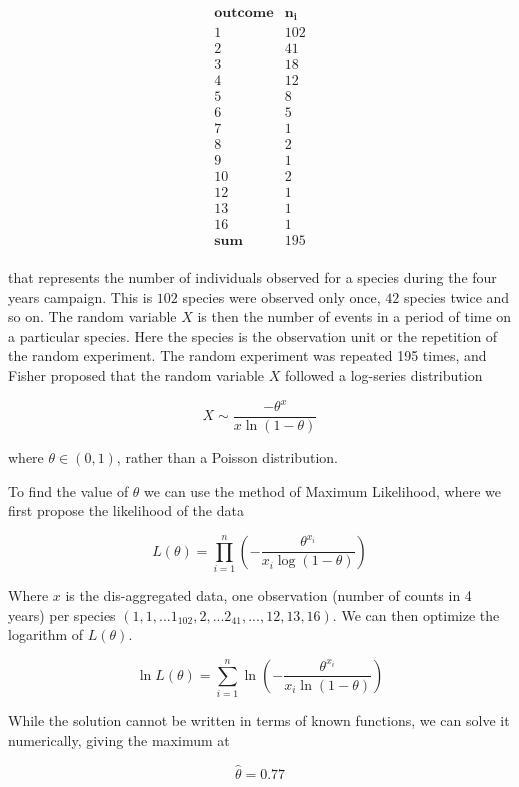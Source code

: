 \documentclass[
]{book}
\begin{document}
\[
\begin{array}{cc}
\mathbf{outcome} & \mathbf{n_i}  \\
  1 & 102 \\
  2 & 41 \\
  3 & 18 \\
  4 & 12 \\
  5 & 8 \\
  6 & 5 \\ 
  7 & 1 \\
  8 & 2 \\
  9 & 1 \\
  10 & 2 \\
  12 & 1 \\
  13 & 1 \\
  16 & 1 \\
 \hline 
\mathbf{sum} & 195\\
\end{array}
\]

that represents the number of individuals observed for a species during the four years campaign. This is \(102\) species were observed only once, \(42\) species twice and so on. The random variable \(X\) is then the number of events in a period of time on a particular species. Here the species is the observation unit or the repetition of the random experiment. The random experiment was repeated 195 times, and Fisher proposed that the random variable \(X\) followed a log-series distribution

\[X \sim \frac{-\theta^x}{x\ln(1-\theta)}\]

where \(\theta \in (0,1)\), rather than a Poisson distribution.

To find the value of \(\theta\) we can use the method of Maximum Likelihood, where we first propose the likelihood of the data

\[
L(\theta) = \prod_{i=1}^{n} \left( -\frac{\theta^{x_i}}{x_i \log(1 - \theta)} \right)
\]

Where \(x\) is the dis-aggregated data, one observation (number of counts in 4 years) per species \((1, 1, ...1_{102}, 2, ...2_{41}, ..., 12, 13, 16)\). We can then optimize the logarithm of \(L(\theta)\).

\[
\ln L(\theta) 
= \sum_{i=1}^{n} \ln\left( -\frac{\theta^{x_i}}{x_i \ln(1 - \theta)} \right)
\]

While the solution cannot be written in terms of known functions, we can solve it numerically, giving the maximum at

\[\hat{\theta}=0.77\]
\end{document}
